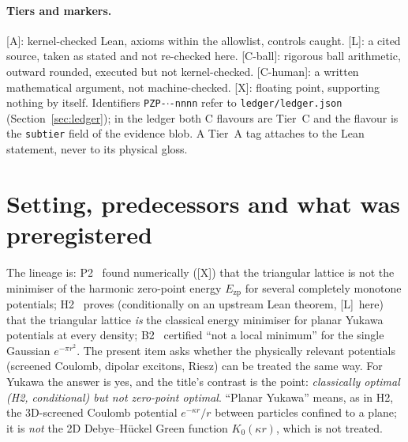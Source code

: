 \documentclass[10pt]{article}
\newcommand{\tier}[1]{\textsf{[#1]}}
\newcommand{\tA}{\tier{A}}
\newcommand{\tL}{\tier{L}}
\newcommand{\tX}{\tier{X}}
\newcommand{\tCh}{\tier{C-human}}
\newcommand{\tCb}{\textcolor{blue!60!black}{\textsf{[C-ball]}}}
\newcommand{\lean}[1]{\texttt{#1}}
\newcommand{\Ezp}{E_{\mathrm{zp}}}
\begin{document}
\begin{abstract}
\textbf{Tier split.} \tA: the Lean~4.34.1 kernel checks the logic, the 1D calculus step (a window lemma), and the signs of the rational certificates; axioms within $\{$\lean{propext}, \lean{Classical.choice}, \lean{Quot.sound}$\}$; planted-\lean{sorry}, planted-axiom and a false Gaussian $a=2$ certificate are caught or rejected. \tCb: the Brillouin-zone integrals, lattice sums and tails are Arb ball-arithmetic enclosures (86,581 cells for the two Yukawa runs, 0 failed), \emph{not} kernel-checked. \tCh: the glue (majorant inequality after integration, $U_2''(0)=E''(0)$, differentiation under the integral, mirror symmetry, identification with the earlier $\Ezp$). The headline is therefore Tier~C overall. A side result $\mathrm{Lap}\,\Ezp(\rho)\in[-2.0824,-1.0185]$ ($\kappa=1$) and $[-1.6088,-0.9343]$ ($\kappa=2$) is conditional on $C^2$ hypotheses and is \tCh.
\end{abstract}

\paragraph{Tiers and markers.} \tA: kernel-checked Lean, axioms within the allowlist, controls caught. \tL: a cited source, taken as stated and not re-checked here. \tCb: rigorous ball arithmetic, outward rounded, executed but not kernel-checked. \tCh: a written mathematical argument, not machine-checked. \tX: floating point, supporting nothing by itself. Identifiers \texttt{PZP-$\cdot$-nnnn} refer to \texttt{ledger/ledger.json} (Section~\ref{sec:ledger}); in the ledger both C flavours are Tier~C and the flavour is the \texttt{subtier} field of the evidence blob. A Tier~A tag attaches to the Lean statement, never to its physical gloss.

\section{Setting, predecessors and what was preregistered}\label{sec:setting}
The lineage is: P2~\cite{p2} found numerically (\tX) that the triangular lattice is not the minimiser of the harmonic zero-point energy $\Ezp$ for several completely monotone potentials; H2~\cite{h2} proves (conditionally on an upstream Lean theorem, \tL\ here) that the triangular lattice \emph{is} the classical energy minimiser for planar Yukawa potentials at every density; B2~\cite{b2} certified ``not a local minimum'' for the single Gaussian $e^{-\pi r^2}$. The present item asks whether the physically relevant potentials (screened Coulomb, dipolar excitons, Riesz) can be treated the same way. For Yukawa the answer is yes, and the title's contrast is the point: \emph{classically optimal (H2, conditional) but not zero-point optimal}. ``Planar Yukawa'' means, as in H2, the 3D-screened Coulomb potential $e^{-\kappa r}/r$ between particles confined to a plane; it is \emph{not} the 2D Debye--H\"uckel Green function $K_0(\kappa r)$, which is not treated.
\end{document}
